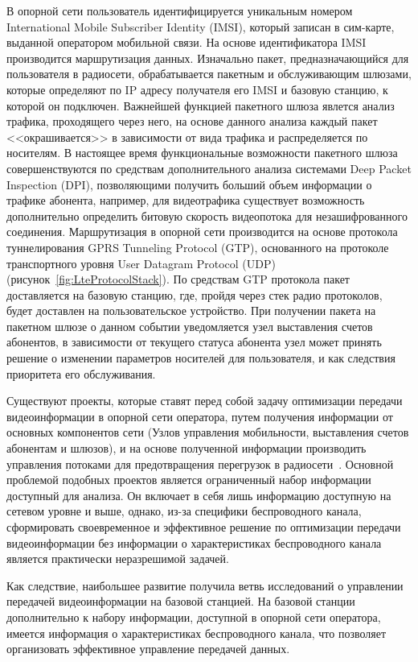 В опорной сети пользователь идентифицируется уникальным номером International Mobile Subscriber Identity (IMSI), который записан в сим-карте, выданной оператором мобильной связи. На основе идентификатора IMSI производится маршрутизация данных. Изначально пакет, предназначающийся для пользователя в радиосети, обрабатывается пакетным и обслуживающим шлюзами, которые определяют по IP адресу получателя его IMSI и базовую станцию, к которой он подключен. Важнейшей функцией пакетного шлюза явлется анализ трафика, проходящего через него, на основе данного анализа каждый пакет <<окрашивается>> в зависимости от вида трафика и распределяется по носителям. В настоящее время функциональные возможности пакетного шлюза совершенствуются по средствам дополнительного анализа системами Deep Packet Inspection (DPI), позволяющими получить больший объем информации о трафике абонента, например, для видеотрафика существует возможность дополнительно определить битовую скорость видеопотока для незашифрованного соединения. Маршрутизация в опорной сети производится на основе протокола туннелирования GPRS Tunneling Protocol (GTP), основанного на протоколе транспортного уровня User Datagram Protocol (UDP) (рисунок~\ref{fig:LteProtocolStack}). По средствам GTP протокола пакет доставляется на базовую станцию, где, пройдя через стек радио протоколов, будет доставлен на пользовательское устройство. При получении пакета на пакетном шлюзе о данном событии уведомляется узел выставления счетов абонентов, в зависимости от текущего статуса абонента узел может принять решение о изменении параметров носителей для пользователя, и как следствия приоритета его обслуживания.

Существуют проекты, которые ставят перед собой задачу оптимизации передачи видеоинформации в опорной сети оператора, путем получения информации от основных компонентов сети (Узлов управления мобильности, выставления счетов абонентам и шлюзов), и на основе полученной информации производить управления потоками для предотвращения перегрузок в радиосети~\cite{MobiVita}. Основной проблемой подобных проектов является ограниченный набор информации доступный для анализа. Он включает в себя лишь информацию доступную на сетевом уровне и выше, однако, из-за специфики беспроводного канала, сформировать своевременное и эффективное решение по оптимизации передачи видеоинформации без информации о характеристиках беспроводного канала является практически неразрешимой задачей.

Как следствие, наибольшее развитие получила ветвь исследований о управлении передачей видеоинформации на базовой станцией. На базовой станции дополнительно к набору информации, доступной в опорной сети оператора, имеется информация о характеристиках беспроводного канала, что позволяет организовать эффективное управление передачей данных.

